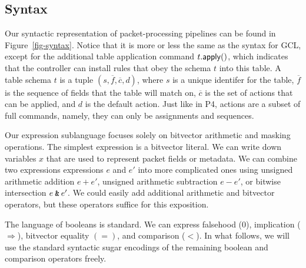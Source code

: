 \subsection{Syntax}

Our syntactic representation of packet-processing pipelines can be
found in Figure~\ref{fig-syntax}. Notice that it is more or less the
same as the syntax for GCL, except for the additional table
application command $t.\mathsf{apply}()$, which indicates that the controller
can install rules that obey the schema $t$ into this table. A table
schema $t$ is a tuple $(s, \overline f, \overline c, d)$, where $s$ is
a unique identifer for the table, $\overline f$ is the sequence of
fields that the table will match on, $\overline c$ is the set of
actions that can be applied, and $d$ is the default action. Just like
in P4, actions are a subset of full commands, namely, they can only be
assignments and sequences.

Our expression sublanguage focuses solely on bitvector arithmetic and
masking operations. The simplest expression is a bitvector literal. We
can write down variables $x$ that are used to represent packet fields
or metadata. We can combine two expressions expressions $e$ and $e'$
into more complicated ones using unsigned arithmetic addition
$e + e'$, unsigned arithmetic subtraction $e - e'$, or bitwise
intersection $e \mathbin{\texttt{\&}} e'$. We could easily add additional arithmetic
and bitvector operators, but these operators suffice for this
exposition.

The language of booleans is standard. We can express falsehood ($0$),
implication ($\Rightarrow$), bitvector equality $(=)$, and comparison
($<$). In what follows, we will use the standard syntactic sugar
encodings of the remaining boolean and comparison operators freely.

